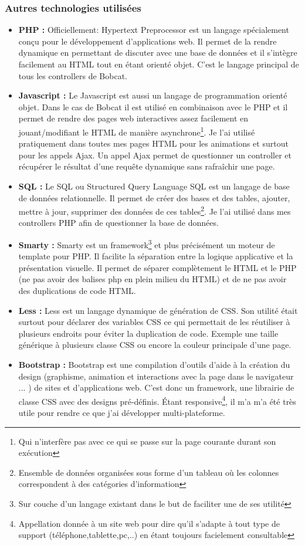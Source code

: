 \documentclass[12pt]{article}
\begin{document}
\subsubsection{Autres technologies utilisées}
\begin{itemize}
\item \textbf{PHP :} Officiellement: Hypertext Preprocessor est un langage spécialement conçu pour le développement d'applications web. Il permet de la rendre dynamique en permettant de discuter avec une base de données et il s'intègre facilement au HTML tout en étant orienté objet. C'est le langage principal de tous les controllers de Bobcat.
\item \textbf{Javascript :} Le Javascript est aussi un langage de programmation orienté objet. Dans le cas de Bobcat il est utilisé en combinaison avec le PHP et il permet de rendre des pages web interactives assez facilement en jouant/modifiant le HTML de manière asynchrone\footnote{Qui n'interfère pas avec ce qui se passe sur la page courante durant son exécution}. Je l'ai utilisé pratiquement dans toutes mes pages HTML pour les animations et surtout pour les appels Ajax. Un appel Ajax permet de questionner un controller et récupérer le résultat d'une requête dynamique sans rafraîchir une page.
\item \textbf{SQL :} Le SQL ou Structured Query Language SQL est un langage de base de données relationnelle. Il permet de créer des bases et des tables, ajouter, mettre à jour, supprimer des données de ces tables\footnote{Ensemble de données organisées sous forme d'un tableau où les colonnes correspondent à des catégories d'information}. Je l'ai utilisé dans mes controllers PHP afin de questionner la base de données.
\item \textbf{Smarty :} Smarty est un framework\footnote{Sur couche d'un langage existant dans le but de faciliter une de ses utilité} et plus précisément un moteur de template pour PHP. Il facilite la séparation entre la logique applicative et la présentation visuelle. Il permet de séparer complètement le HTML et le PHP (ne pas avoir des balises php en plein milieu du HTML) et de ne pas avoir des duplications de code HTML. 
\item \textbf{Less :} Less est un langage dynamique de génération de CSS. Son utilité était surtout pour déclarer des variables CSS ce qui permettait de les réutiliser à plusieurs endroits pour éviter la duplication de code. Exemple une taille générique à plusieurs classe CSS ou encore la couleur principale d'une page.
\item \textbf{Bootstrap :} Bootstrap est une compilation d'outils d'aide à la création du design (graphisme, animation et interactions avec la page dans le navigateur ... ) de sites et d'applications web. C'est donc un framework, une librairie de classe CSS avec des designs pré-définis. Étant responsive\footnote{Appellation donnée à un site web pour dire qu'il s'adapte à tout type de support (téléphone,tablette,pc,..) en étant toujours facielement consultable}, il m'a m'a été très utile pour rendre ce que j'ai développer multi-plateforme.
\end{itemize}
\end{document}
